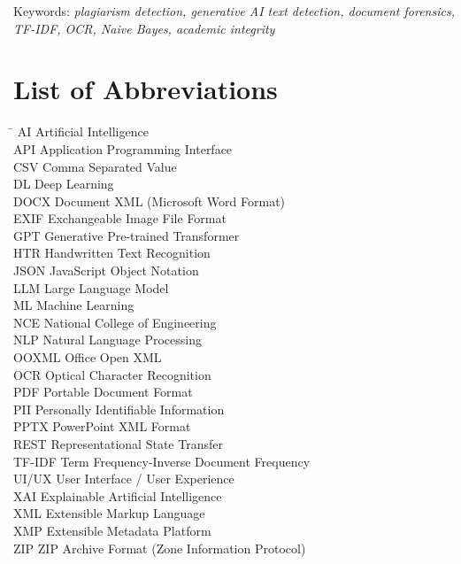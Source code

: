 \documentclass[12pt, a4paper]{report}
\numberwithin{equation}{chapter}
\begin{document}
\noindent Keywords: \textit{plagiarism detection, generative AI text detection, document forensics, TF-IDF, OCR, Naive Bayes, academic integrity}

\newpage

\tableofcontents
\newpage

\listoffigures
{}
\newpage

\listoftables
{}
\newpage

\chapter*{List of Abbreviations}

\begin{tabbing}
\hspace{3cm} \= \kill
AI \> Artificial Intelligence \\
API \> Application Programming Interface \\
CSV \> Comma Separated Value \\
DL \> Deep Learning \\
DOCX \> Document XML (Microsoft Word Format) \\
EXIF \> Exchangeable Image File Format \\
GPT \> Generative Pre-trained Transformer \\
HTR \> Handwritten Text Recognition \\
JSON \> JavaScript Object Notation \\
LLM \> Large Language Model \\
ML \> Machine Learning \\
NCE \> National College of Engineering \\
NLP \> Natural Language Processing \\
OOXML \> Office Open XML \\
OCR \> Optical Character Recognition \\
PDF \> Portable Document Format \\
PII \> Personally Identifiable Information \\
PPTX \> PowerPoint XML Format \\
REST \> Representational State Transfer \\
TF-IDF \> Term Frequency-Inverse Document Frequency \\
UI/UX \> User Interface / User Experience \\
XAI \> Explainable Artificial Intelligence \\
XML \> Extensible Markup Language \\
XMP \> Extensible Metadata Platform \\
ZIP \> ZIP Archive Format (Zone Information Protocol) \\\end{tabbing}
\end{document}
